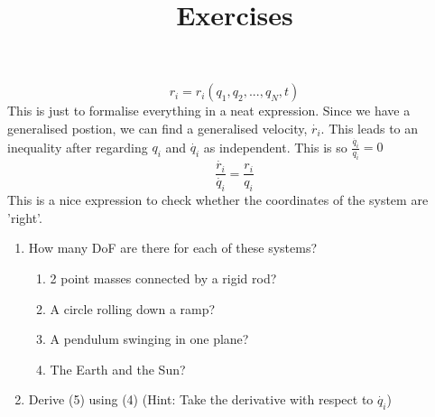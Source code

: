 \begin{equation}
r_{i} = r_{i}(q_{1}, q_{2}, ..., q_{N}, t)
\end{equation}
This is just to formalise everything in a neat expression. Since we have a generalised postion, we can find a generalised velocity, $\dot{r_{i}}$. This leads to an inequality after regarding $q_{i}$ and $\dot{q_{i}}$ as independent. This is so $\frac{\dot{q_{i}}}{q_{i}} =  0$
\begin{equation}
 \frac{\dot{r_{i}}}{\dot{q_{i}}} =  \frac{r_{i}}{q_{i}} 
\end{equation}
This is a nice expression to check whether the coordinates of the system are 'right'.
\par


 

\title{\large{Exercises}}
\begin{enumerate}
	\item How many DoF are there for each of these systems?
	\begin{enumerate}
		\item 2 point masses connected by a rigid rod? 
		\item A circle rolling down a ramp?
		\item A pendulum swinging in one plane?
		\item The Earth and the Sun? 
	\end{enumerate}
	\item Derive (5) using (4) (Hint: Take the derivative with respect to $\dot{q_{i}}$)

\end{enumerate}











